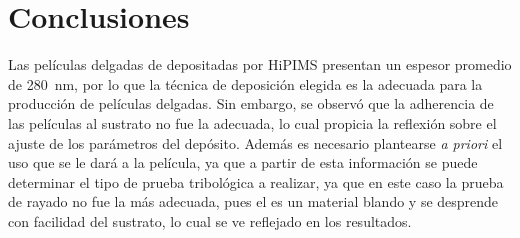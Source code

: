 \documentclass[12pt]{IEEEtran}
\begin{document}
\section{Conclusiones}

Las películas delgadas de  depositadas por HiPIMS presentan un espesor promedio de \qty{280}{\nm}, por lo que la técnica de deposición elegida es la adecuada para la producción de películas delgadas. Sin embargo, se observó que la adherencia de las películas al sustrato no fue la adecuada, lo cual propicia la reflexión sobre el ajuste de los parámetros del depósito. Además es necesario plantearse \emph{a priori} el uso que se le dará a la película, ya que a partir de esta información se puede determinar el tipo de prueba tribológica a realizar, ya que en este caso la prueba de rayado no fue la más adecuada, pues el  es un material blando y se desprende con facilidad del sustrato, lo cual se ve reflejado en los resultados.

\nocite{*}
\printbibliography
\end{document}
